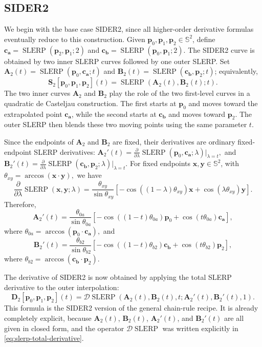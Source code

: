 \documentclass[a4paper,11pt]{article}
\newcommand{\bx}{\mathbf{x}}
\newcommand{\by}{\mathbf{y}}
\newcommand{\bp}{\mathbf{p}}
\newcommand{\ba}{\mathbf{a}}
\newcommand{\bb}{\mathbf{b}}
\newcommand{\bc}{\mathbf{c}}
\newcommand{\bA}{\mathbf{A}}
\newcommand{\bB}{\mathbf{B}}
\newcommand{\bD}{\mathbf{D}}
\numberwithin{equation}{section}
\theoremstyle{plain}
\theoremstyle{definition}
\theoremstyle{remark}
\newcommand{\Sph}{\mathbb{S}^2}
\newcommand{\slerp}{\operatorname{SLERP}}
\begin{document}
\subsection{SIDER2}

We begin with the base case SIDER2, since all higher-order derivative formulas eventually reduce to this construction.  Given \(\bp_0,\bp_1,\bp_2\in\Sph\), define \(\bc_\ba=\slerp(\bp_2,\bp_1;2)\) and \(\bc_\bb=\slerp(\bp_0,\bp_1;2)\).  The SIDER2 curve is obtained by two inner SLERP curves followed by one outer SLERP.  Set \(\bA_2(t)=\slerp(\bp_0,\bc_\ba;t)\) and \(\bB_2(t)=\slerp(\bc_\bb,\bp_2;t)\); equivalently,
\[
\mathbf{S}_2[\bp_0,\bp_1,\bp_2](t)=\slerp(\bA_2(t),\bB_2(t);t).
\]
The two inner curves $\bA_2$ and $\bB_2$ play the role of the two first-level curves in a quadratic de Casteljau construction.  The first starts at $\bp_0$ and moves toward the extrapolated point $\bc_\ba$, while the second starts at $\bc_\bb$ and moves toward $\bp_2$.  The outer SLERP then blends these two moving points using the same parameter $t$.

Since the endpoints of $\bA_2$ and $\bB_2$ are fixed, their derivatives are ordinary fixed-endpoint SLERP derivatives:
\(\bA_2'(t) = \frac{\partial}{\partial \lambda} \slerp(\bp_0,\bc_\ba;\lambda)\bigg|_{\lambda=t},\)
and
\(\bB_2'(t) = \frac{\partial}{\partial \lambda} \slerp(\bc_\bb,\bp_2;\lambda)\bigg|_{\lambda=t}.\)
For fixed endpoints $\bx,\by\in \Sph$, with
\(\theta_{xy}=\arccos(\bx\cdot \by),\)
we have
\[
        \frac{\partial}{\partial \lambda}\slerp(\bx,\by;\lambda)
        =
        \frac{\theta_{xy}}{\sin\theta_{xy}}
        \left[
        -\cos((1-\lambda)\theta_{xy})\bx
        +
        \cos(\lambda\theta_{xy})\by
        \right].
\]
Therefore,
\[
        \bA_2'(t)
        =
        \frac{\theta_{0a}}{\sin\theta_{0a}}
        \left[
        -\cos((1-t)\theta_{0a})\bp_0
        +
        \cos(t\theta_{0a})\bc_\ba
        \right],
\]
where
\(\theta_{0a}=\arccos(\bp_0\cdot \bc_\ba),\)
and
\[
        \bB_2'(t)
        =
        \frac{\theta_{b2}}{\sin\theta_{b2}}
        \left[
        -\cos((1-t)\theta_{b2})\bc_\bb
        +
        \cos(t\theta_{b2})\bp_2
        \right],
\]
where
\(\theta_{b2}=\arccos(\bc_\bb\cdot \bp_2).\)

The derivative of SIDER2 is now obtained by applying the total SLERP derivative to the outer interpolation:
\begin{equation}
\label{eq:d2-general}
\boxed{
        \bD_2[\bp_0,\bp_1,\bp_2](t)
        =
        \mathcal{D}\slerp
        \left(
        \bA_2(t),\bB_2(t),t;
        \bA_2'(t),\bB_2'(t),1
        \right).
}
\end{equation}
This formula is the SIDER2 version of the general chain-rule recipe.  It is already completely explicit, because $\bA_2(t)$, $\bB_2(t)$, $\bA_2'(t)$, and $\bB_2'(t)$ are all given in closed form, and the operator $\mathcal{D}\slerp$ was written explicitly in \eqref{eq:slerp-total-derivative}.
\end{document}
